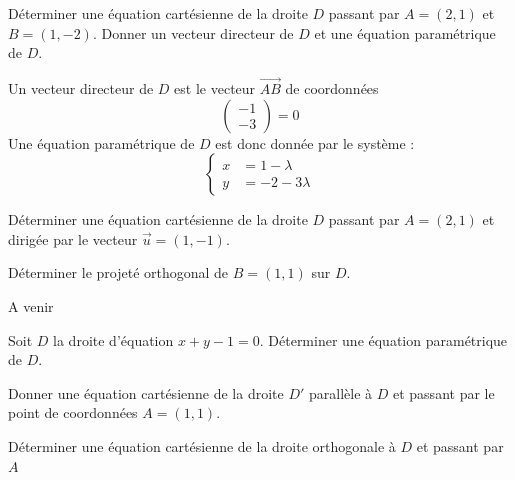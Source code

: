 \documentclass[a4paper, 11pt]{article}
\begin{document}
\begin{exercice}  \;
	D\'eterminer une équation cartésienne de la droite $D$ passant par $A=(2,1)$ et $B=(1,-2)$. Donner un vecteur directeur de $D$ et une équation paramétrique de $D$.
\end{exercice}

\begin{correction}
	Un vecteur directeur de $D$ est le vecteur $\Vec{AB}$ de coordonnées
	$$\left(\begin{array}{c}
				-1 \\
				-3
			\end{array} \right)=0$$
	Une équation paramétrique de $D$ est donc donnée par le système :
	$$\left\{\begin{array}{cc}
			x & = 1 -\lambda \\
			y & =-2-3\lambda
		\end{array} \right.$$




\end{correction}



\begin{exercice}  \;
	D\'eterminer une équation cartésienne de la droite $D$ passant par $A=(2,1)$ et dirigée par le vecteur $\vec{u}=(1,-1)$.

	Déterminer le projeté orthogonal de $B=(1,1)$ sur $D$.
\end{exercice}

\begin{correction}
	A venir
\end{correction}






\begin{exercice}  \;
	Soit $D$ la droite d'équation $x+y-1=0$. Déterminer une équation paramétrique de $D$.

	Donner une équation cartésienne de la droite $D'$ parallèle à $D$ et passant par le point de coordonnées $A=(1,1)$.

	Déterminer une équation cartésienne de la droite orthogonale à $D$ et passant par $A$
\end{exercice}
\end{document}
